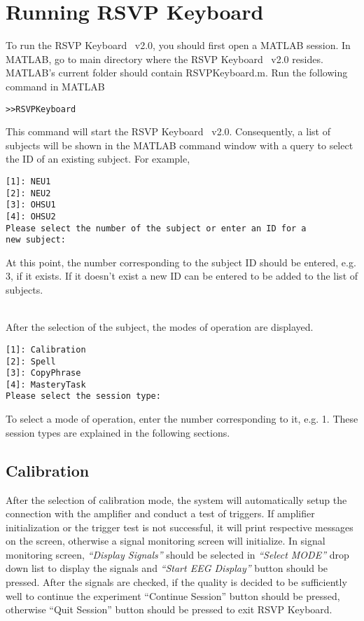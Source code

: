 \documentclass[12pt,letterpaper]{report}
\begin{document}
\chapter{Running RSVP Keyboard\texttrademark}
To run the RSVP Keyboard\texttrademark~ v2.0, you should first open a MATLAB session. In MATLAB, go to main directory where the RSVP Keyboard\texttrademark~ v2.0 resides. MATLAB's current folder should contain RSVPKeyboard.m. Run the following command in MATLAB
\begin{verbatim}
>>RSVPKeyboard
\end{verbatim}

This command will start the RSVP Keyboard\texttrademark~ v2.0. Consequently, a list of subjects will be shown in the MATLAB command window with a query to select the ID of an existing subject. For example,
\begin{verbatim}
[1]: NEU1
[2]: NEU2
[3]: OHSU1
[4]: OHSU2
Please select the number of the subject or enter an ID for a 
new subject:
\end{verbatim}
At this point, the number corresponding to the subject ID should be entered, e.g. 3, if it exists. If it doesn't exist a new ID can be entered to be added to the list of subjects. 

\\

After the selection of the subject, the modes of operation are displayed.
\begin{samepage}
\begin{verbatim}
[1]: Calibration
[2]: Spell
[3]: CopyPhrase
[4]: MasteryTask
Please select the session type:
\end{verbatim}
\end{samepage}
To select a mode of operation, enter the number corresponding to it, e.g. 1. These session types are explained in the following sections.
\section{Calibration}
After the selection of calibration mode, the system will automatically setup the connection with the amplifier and conduct a test of triggers. If amplifier initialization or the trigger test is not successful, it will print respective messages on the screen, otherwise a signal monitoring screen will initialize. In signal monitoring screen, \textit{``Display Signals''} should be selected in \textit{``Select MODE''} drop down list to display the signals and \textit{``Start EEG Display''} button should be pressed. After the signals are checked, if the quality is decided to be sufficiently well to continue the experiment ``Continue Session'' button should be pressed, otherwise ``Quit Session'' button should be pressed to exit RSVP Keyboard\texttrademark .
\end{document}

